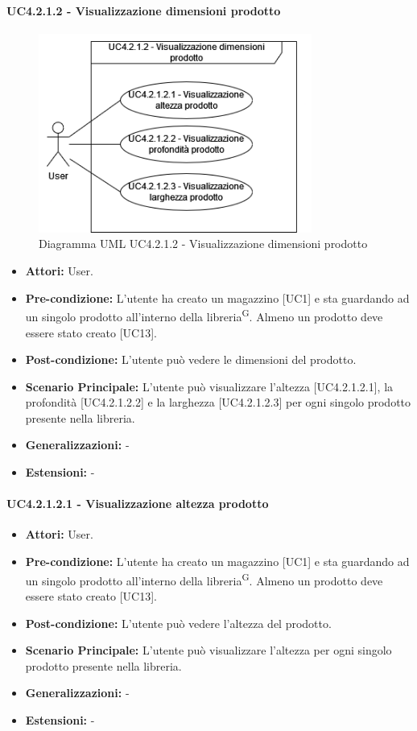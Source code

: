 \paragraph{UC4.2.1.2 - Visualizzazione dimensioni prodotto}
\begin{figure}[H]
  \centering
  \includegraphics[width=0.8\textwidth]{UC_diagrams_1-10/UC4.2.1.2.drawio.png}
   \caption{Diagramma UML UC4.2.1.2 - Visualizzazione dimensioni prodotto}
\end{figure}
\begin{itemize} 
    \item \textbf{Attori:} User.
    \item \textbf{Pre-condizione:} L'utente ha creato un magazzino [UC1] e sta guardando ad un singolo prodotto all'interno della libreria\textsuperscript{G}. Almeno un prodotto deve essere stato creato [UC13].
    \item \textbf{Post-condizione:}  L'utente può vedere le dimensioni del prodotto.
    \item \textbf{Scenario Principale:} L'utente può visualizzare l'altezza [UC4.2.1.2.1], la profondità [UC4.2.1.2.2] e la larghezza [UC4.2.1.2.3] per ogni singolo prodotto presente nella libreria. 
    \item \textbf{Generalizzazioni:} -
    \item \textbf{Estensioni:} -
\end{itemize}


\paragraph{UC4.2.1.2.1 - Visualizzazione altezza prodotto}
\begin{itemize} 
    \item \textbf{Attori:} User.
    \item \textbf{Pre-condizione:} L'utente ha creato un magazzino [UC1] e sta guardando ad un singolo prodotto all'interno della libreria\textsuperscript{G}. Almeno un prodotto deve essere stato creato [UC13].
    \item \textbf{Post-condizione:}  L'utente può vedere l'altezza del prodotto.
    \item \textbf{Scenario Principale:} L'utente può visualizzare l'altezza per ogni singolo prodotto presente nella libreria. 
    \item \textbf{Generalizzazioni:} -
    \item \textbf{Estensioni:} -
\end{itemize}


